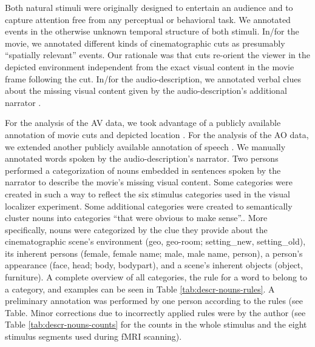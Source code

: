 \documentclass[english]{article}
\begin{document}
Both natural stimuli were originally designed to entertain an audience and to capture attention free from any perceptual or behavioral task.
We annotated events in the otherwise unknown temporal structure of both stimuli.
In/for the movie, we annotated different kinds of cinematographic cuts \citep{haeusler2016cutanno} as presumably ``spatially relevant'' events.
Our rationale was that cuts re-orient the viewer in the depicted environment
independent from the exact visual content in the movie frame following the cut.
In/for the audio-description, we annotated verbal clues about the missing visual content given by the audio-description's additional narrator \citep{haeusler2020speechanno}.

For the analysis of the AV data, we took advantage of a publicly available
annotation of movie cuts and depicted location \citep{haeusler2016cutanno}.
For the analysis of the AO data, we extended another publicly available
annotation of speech \citep{haeusler2020speechanno}. We manually annotated words
spoken by the audio-description's narrator.
Two persons performed a categorization of nouns embedded in sentences spoken by
the narrator to describe the movie's missing visual content. Some categories
were created in such a way to reflect the six stimulus categories used in the
visual localizer experiment. Some additional categories were created to
semantically cluster nouns into categories ``that were obvious to make
sense''..
More specifically, nouns were categorized by the clue they provide about the
cinematographic scene's environment (geo, geo-room; setting\_new, setting\_old),
its inherent persons (female, female name; male, male name, person), a person's
appearance (face, head; body, bodypart), and a scene's inherent objects (object,
furniture).
A complete overview of all categories, the rule for a word to belong to a
category, and examples can be seen in Table \ref{tab:descr-nouns-rules}.
A preliminary annotation was performed by one person according to the rules (see
Table. Minor corrections due to incorrectly applied rules were by the author
(see Table \ref{tab:descr-nouns-counts} for the counts in the whole stimulus and
the eight stimulus segments used during fMRI scanning).

\end{document}
